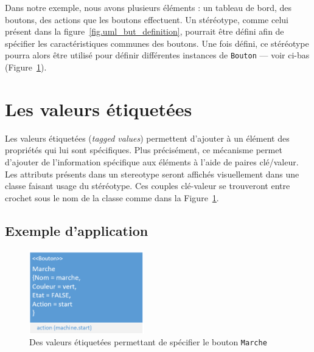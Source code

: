 


Dans notre exemple, nous avons plusieurs éléments : un tableau de bord, des boutons, des actions que les boutons effectuent.
Un stéréotype, comme celui présent dans la figure~\ref{fig.uml_but_definition}, pourrait être d\'efini afin de sp\'ecifier les caractéristiques communes des boutons.
%
Une fois d\'efini, ce st\'er\'eotype pourra alors \^etre utilis\'e pour
d\'efinir diff\'erentes instances de \texttt{Bouton} --- voir ci-bas (Figure~\ref{fig.uml_marche}).



\section{Les valeurs \'etiquet\'ees}

Les valeurs \'etiquet\'ees (\emph{tagged values}) permettent d'ajouter \`a un \'el\'ement des propriétés qui lui sont spécifiques.
Plus pr\'ecis\'ement, ce m\'ecanisme permet d'ajouter de l'information spécifique aux éléments \`a l'aide de paires clé/valeur.
Les attributs présents dans un stereotype seront affichés visuellement dans une classe faisant usage du stéréotype.
Ces couples clé-valeur se trouveront entre crochet sous le nom de la classe comme dans la Figure~\ref{fig.uml_marche}.


\subsection{Exemple d'application}

\begin{figure}
    \begin{center}
    \includegraphics[width=5cm]{10_img/chap4/start.PNG}
    \caption{Des valeurs \'etiquet\'ees permettant de spécifier le bouton \texttt{Marche}}
    \label{fig.uml_marche}
    \end{center}
\end{figure}

